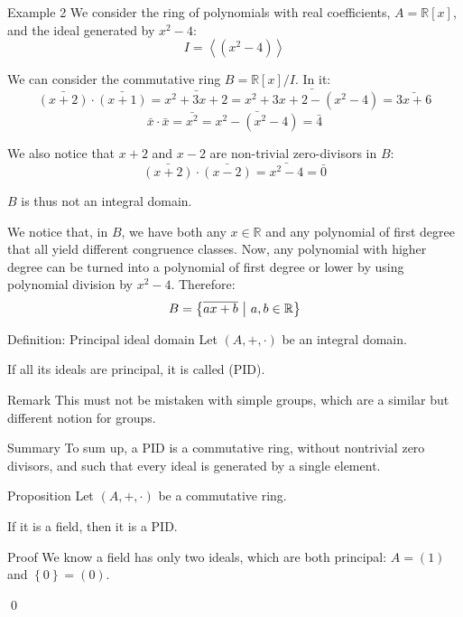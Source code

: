 \documentclass[a4paper]{article}
\begin{document}
\begin{parag}{Example 2}
    We consider the ring of polynomials with real coefficients, $A = \mathbb{R}\left[x\right]$, and the ideal generated by $x^2 - 4$: 
    \[I = \left\langle \left(x^2 - 4\right) \right\rangle\]
    
    We can consider the commutative ring $B = \mathbb{R}\left[x\right] / I$. In it: 
    \[\bar{\left(x + 2\right)}\cdot \bar{\left(x + 1\right)} = \bar{x^2 + 3x + 2} = \bar{x^2 + 3x + 2 - \left(x^2 - 4\right)} = \bar{3x + 6}\] 
    \[\bar{x}\cdot \bar{x} = \bar{x^2} = \bar{x^2 - \left(x^2 - 4\right)} = \bar{4}\]
    
    We also notice that $x+2$ and $x-2$ are non-trivial zero-divisors in $B$: 
    \[\bar{\left(x+2\right)}\cdot \bar{\left(x-2\right)} = \bar{x^2 - 4} = \bar{0}\]
    
    $B$ is thus not an integral domain.

    We notice that, in $B$, we have both any $x \in \mathbb{R}$ and any polynomial of first degree that all yield different congruence classes. Now, any polynomial with higher degree can be turned into a polynomial of first degree or lower by using polynomial division by $x^2 - 4$. Therefore: 
    \[B = \left\{\bar{ax + b} \suchthat a, b \in \mathbb{R}\right\}\]
\end{parag}

\begin{parag}{Definition: Principal ideal domain}
    Let $\left(A, +, \cdot \right)$ be an integral domain.

    If all its ideals are principal, it is called  (PID).

    \begin{subparag}{Remark}
        This must not be mistaken with simple groups, which are a similar but different notion for groups.
    \end{subparag}

    \begin{subparag}{Summary}
        To sum up, a PID is a commutative ring, without nontrivial zero divisors, and such that every ideal is generated by a single element.
    \end{subparag}
\end{parag}


\begin{parag}{Proposition}
    Let $\left(A, +, \cdot \right)$ be a commutative ring.

    If it is a field, then it is a PID.

    \begin{subparag}{Proof}
        We know a field has only two ideals, which are both principal: $A = \left(1\right)$ and $\left\{0\right\} = \left(0\right)$.

        \qed
    \end{subparag}
\end{parag}
\end{document}
